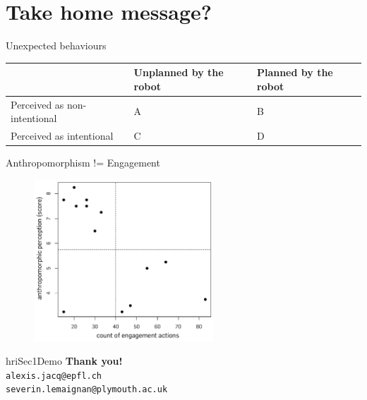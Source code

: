 \documentclass[compress]{beamer}
\begin{document}
\section{Take home message?}
\begin{frame}{Unexpected behaviours}
    \begin{tabular}{  >{\centering\arraybackslash}m{2cm} | >{\centering\arraybackslash}m{2cm} | >{\centering\arraybackslash}m{2cm} }
        & Unplanned by the robot & Planned by the robot \\ \hline
        Perceived as non-intentional & A  & B  \\ \hline
        Perceived as intentional &  C & D 
    \end{tabular}

\end{frame}

{
\begin{frame}{Anthropomorphism != Engagement}

\begin{figure}
    \hspace*{5cm}\includegraphics[width=0.6\textwidth]{domino-correlation}
\end{figure}
\end{frame}
}



{
\begin{frame}[plain]

\begin{beamercolorbox}[wd=\linewidth,ht=6ex,dp=0.7ex]{hriSec1Demo}
    \textbf{Thank you!}\\
    \scriptsize
    {\tt alexis.jacq@epfl.ch}\\
    {\tt severin.lemaignan@plymouth.ac.uk}
\end{beamercolorbox}
    \vfill

\end{frame}
}
\end{document}
